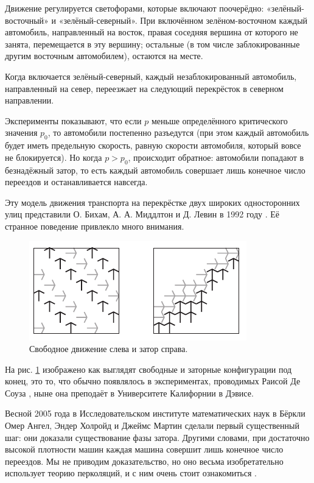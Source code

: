 Движение регулируется светофорами, которые включают поочерёдно:
«зелёный-восточный» и «зелёный-северный».
При включённом
зелёном-восточном каждый автомобиль, направленный на восток, правая
соседняя вершина от которого не занята, перемещается в эту вершину;
остальные (в том числе заблокированные другим восточным автомобилем),
остаются на месте.

Когда включается зелёный-северный, каждый незаблокированный
автомобиль, направленный на север, переезжает на следующий перекрёсток в
северном направлении.

Эксперименты показывают, что если $p$ меньше определённого
критического значения $p_0$, то автомобили постепенно разъедутся
(при этом каждый автомобиль будет иметь предельную скорость,
равную скорости автомобиля, который вовсе не блокируется).
Но когда
$p> p_0$, происходит обратное: автомобили попадают в безнадёжный
затор, то есть каждый автомобиль совершает лишь конечное число переездов
и останавливается навсегда.

Эту модель движения транспорта на перекрёстке двух широких односторонних улиц представили О. Бихам, А. А. Миддлтон и Д. Левин в 1992 году \cite{6}.
Её странное поведение привлекло много внимания.

\begin{figure}[htb!]
\centering
\includegraphics[scale=1]{pics/gridlock}
\caption{Свободное движение слева и затор справа.}
\label{pic:gridlock}
\end{figure}

На рис. \ref{pic:gridlock} изображено как выглядят свободные и заторные конфигурации под конец, это то, что обычно появлялось в экспериментах, проводимых Раисой Де Соуза \cite{15}, ныне она преподаёт в Университете Калифорнии в Дэвисе.

Весной 2005 года в Исследовательском институте математических наук в Бёркли Омер Ангел, Эндер Холройд и Джеймс Мартин сделали первый существенный шаг: они доказали существование фазы затора.
Другими словами, при достаточно высокой плотности машин каждая машина совершит лишь конечное число переездов.
Мы не приводим доказательство, но оно весьма изобретательно использует теорию перколяций, и с ним очень стоит ознакомиться \cite{2}.

